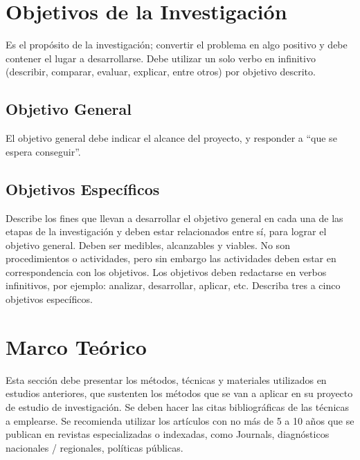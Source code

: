 \documentclass[12pt,a4paper]{article}
\begin{document}
\section{Objetivos de la Investigación}
\noindent
Es el propósito de la investigación; convertir el problema en algo positivo y debe
contener el lugar a desarrollarse. Debe utilizar un solo verbo en infinitivo (describir,
comparar, evaluar, explicar, entre otros) por objetivo descrito.

\subsection*{Objetivo General}
\noindent
El objetivo general debe
indicar el alcance del proyecto, y responder a “que se espera conseguir”.

\subsection*{Objetivos Específicos}
\noindent
Describe los fines que llevan a desarrollar el objetivo general en cada una de las
etapas de la investigación y deben estar relacionados entre sí, para lograr el objetivo
general. Deben ser medibles, alcanzables y viables. No son procedimientos o
actividades, pero sin embargo las actividades deben estar en correspondencia con
los objetivos. Los objetivos deben redactarse en verbos infinitivos, por ejemplo:
analizar, desarrollar, aplicar, etc. Describa tres a cinco objetivos específicos.

\section{Marco Teórico}
\noindent
Esta sección debe presentar los métodos, técnicas y materiales utilizados en
estudios anteriores, que sustenten los métodos que se van a aplicar en su proyecto
de estudio de investigación. Se deben hacer las citas bibliográficas de las técnicas a emplearse. Se recomienda utilizar los artículos con no más de 5 a 10 años que se
publican en revistas especializadas o indexadas, como Journals, diagnósticos
nacionales / regionales, políticas públicas.
\end{document}
